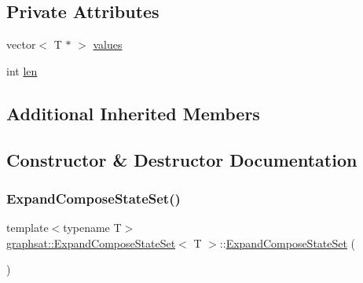 \subsection*{Private Attributes}
\begin{DoxyCompactItemize}
\item 
vector$<$ T $\ast$ $>$ \mbox{\hyperlink{classgraphsat_1_1_expand_compose_state_set_ad7e80585398422e131484fb801cfdaf1}{values}}
\item 
int \mbox{\hyperlink{classgraphsat_1_1_expand_compose_state_set_a77327c86889a6eeca113a9d4af72049c}{len}}
\end{DoxyCompactItemize}
\subsection*{Additional Inherited Members}


\subsection{Constructor \& Destructor Documentation}
\mbox{\label{classgraphsat_1_1_expand_compose_state_set_a81cb6c2632c0282fad861ed5401df3df}} 
\subsubsection{\texorpdfstring{ExpandComposeStateSet()}{ExpandComposeStateSet()}\hspace{0.1cm}{\footnotesize\ttfamily [1/2]}}
{\footnotesize\ttfamily template$<$typename T$>$ \\
\mbox{\hyperlink{classgraphsat_1_1_expand_compose_state_set}{graphsat\+::\+Expand\+Compose\+State\+Set}}$<$ T $>$\+::\mbox{\hyperlink{classgraphsat_1_1_expand_compose_state_set}{Expand\+Compose\+State\+Set}} (\begin{DoxyParamCaption}{ }\end{DoxyParamCaption})\hspace{0.3cm}{\ttfamily [inline]}}

\mbox{\label{classgraphsat_1_1_expand_compose_state_set_a393b8b91725f39cbad5e1b3e0102f85a}} 
